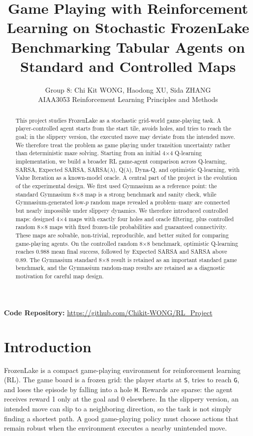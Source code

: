 \documentclass[10pt]{article}
\title{\vspace{-1.2em}\textbf{Game Playing with Reinforcement Learning on Stochastic FrozenLake}\\[-0.25em]
{\large Benchmarking Tabular Agents on Standard and Controlled Maps}}
\author{Group 8: Chi Kit WONG, Haodong XU, Sida ZHANG\\
AIAA3053 Reinforcement Learning Principles and Methods}
\date{}
\begin{document}
\maketitle

\vspace{-1.8em}
\begin{center}
\textbf{Code Repository:} \url{https://github.com/Chikit-WONG/RL_Project}
\end{center}


\begin{abstract}
\noindent This project studies FrozenLake as a stochastic grid-world game-playing task. A player-controlled agent starts from the start tile, avoids holes, and tries to reach the goal; in the slippery version, the executed move may deviate from the intended move. We therefore treat the problem as game playing under transition uncertainty rather than deterministic maze solving. Starting from an initial 4$\times$4 Q-learning implementation, we build a broader RL game-agent comparison across Q-learning, SARSA, Expected SARSA, SARSA($\lambda$), Q($\lambda$), Dyna-Q, and optimistic Q-learning, with Value Iteration as a known-model oracle. A central part of the project is the evolution of the experimental design. We first used Gymnasium as a reference point: the standard Gymnasium 8$\times$8 map is a strong benchmark and sanity check, while Gymnasium-generated low-$p$ random maps revealed a problem--many are connected but nearly impossible under slippery dynamics. We therefore introduced controlled maps: designed 4$\times$4 maps with exactly four holes and oracle filtering, plus controlled random 8$\times$8 maps with fixed frozen-tile probabilities and guaranteed connectivity. These maps are solvable, non-trivial, reproducible, and better suited for comparing game-playing agents. On the controlled random 8$\times$8 benchmark, optimistic Q-learning reaches 0.988 mean final success, followed by Expected SARSA and SARSA above 0.89. The Gymnasium standard 8$\times$8 result is retained as an important standard game benchmark, and the Gymnasium random-map results are retained as a diagnostic motivation for careful map design.
\end{abstract}

\section{Introduction}
FrozenLake is a compact game-playing environment for reinforcement learning (RL). The game board is a frozen grid: the player starts at \texttt{S}, tries to reach \texttt{G}, and loses the episode by falling into a hole \texttt{H}. Rewards are sparse: the agent receives reward 1 only at the goal and 0 elsewhere. In the slippery version, an intended move can slip to a neighboring direction, so the task is not simply finding a shortest path. A good game-playing policy must choose actions that remain robust when the environment executes a nearby unintended move.
\end{document}
